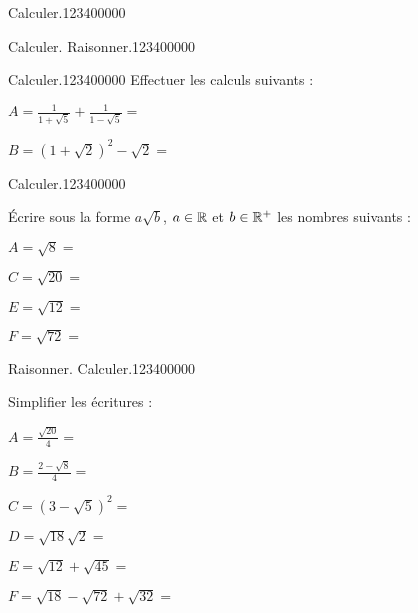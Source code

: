 \begin{pageAD}  %
\restoregeometry %


\begin{ExoCad}{Calculer.}{1234}{0}{0}{0}{0}{0}

 
 
 
\end{ExoCad}

 
\begin{ExoCad}{Calculer. Raisonner.}{1234}{0}{0}{0}{0}{0}




\end{ExoCad}





\begin{ExoCad}{Calculer.}{1234}{0}{0}{0}{0}{0}
Effectuer les calculs suivants :

$A=\frac{1}{1+\sqrt5} +\frac{1}{1-\sqrt5} = $ 

$B=\left(1+\sqrt2\right)^2  -\sqrt2 = $ 
\end{ExoCad}


\begin{ExoCad}{Calculer.}{1234}{0}{0}{0}{0}{0}
 
Écrire sous la forme $a\sqrt{b}$, $a\in\mathbb R$ et $b \in \mathbb R^+$ les nombres suivants : \vspace{0.4cm}

\begin{minipage}{0.5\linewidth}
$A = \sqrt{8}=$  
 
$C=\sqrt{20}=$   
\end{minipage}
\vrule
\begin{minipage}{0.5\linewidth}
$E=\sqrt{12}=$   

$F=\sqrt{72}=$  
\end{minipage}
 
\end{ExoCad}


\begin{ExoCad}{Raisonner. Calculer.}{1234}{0}{0}{0}{0}{0}

Simplifier les écritures : \vspace{0.4cm}

$A=\frac{\sqrt{20}}{4}=$  

$B = \frac{2-\sqrt{8}}{4}=$ 

$C=\left( 3-\sqrt{5}\right)^2=$  

$D=\sqrt{18}\sqrt{2}=$   

 $E=\sqrt{12}+\sqrt{45}=$  
 
 $F=\sqrt{18} -\sqrt{72} +\sqrt{32}=$ 
\end{ExoCad}
 
 
 
\end{pageAD} %


